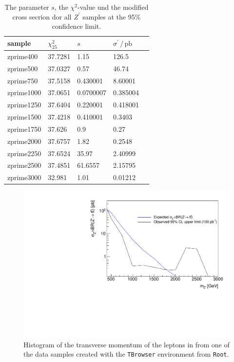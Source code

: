 \begin{table}[H]
  \centering
  \begin{tabular}{l|llll}
      sample           &  $\chi^2_{25}$  & $s$ & $\sigma^\prime \, / \, \si{\pico\barn}$ \\
      \hline
      zprime400  &   37.7281   &          1.15                      & 126.5           \\
      zprime500  &   37.0327   &          0.57                      & 46.74           \\
      zprime750  &   37.5158   &          0.430001                      & 8.60001         \\
      zprime1000 &   37.0651   &          0.0700007                      & 0.385004        \\
      zprime1250 &   37.6404   &          0.220001                      & 0.418001        \\
      zprime1500 &   37.4218   &          0.410001                      & 0.3403          \\
      zprime1750 &   37.626    &          0.9                      & 0.27            \\
      zprime2000 &   37.6757   &          1.82                      & 0.2548          \\
      zprime2250 &   37.6524   &          35.97                      & 2.40999         \\
      zprime2500 &   37.4851   &          61.6557                      & 2.15795         \\
      zprime3000 &   32.981    &          1.01                      & 0.01212         \\
      \end{tabular}
\caption{The parameter $s$, the $\chi^2$-value und the modified cross secrion dor all $Z^\prime$ samples at the 95\% confidence limit.}
\label{tab:lim}

  \end{table}




  \begin{figure}[tb]
    \centering
    \includegraphics[width=.9\textwidth]{plots/limits.pdf}
    \caption{Histogram of the transverse momentum of the leptons in from one of the data samples created with the \texttt{TBrowser} environment from \texttt{Root}.}
    \label{fig:sigm}
  \end{figure}